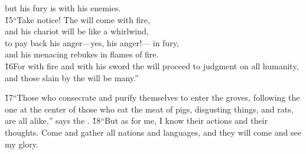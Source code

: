 \begin{poetry}
\poemlll       but his fury is with his enemies. \\
\poeml \v{15}``Take notice! The  will come with fire, \\
\poemll    and his chariot will be like a whirlwind, \\
\poeml to pay back his anger---yes, his anger!--- in fury, \\
\poemll    and his menacing rebukes in flames of fire. \\
\poeml \v{16}For with fire and with his sword the  will proceed to judgment on all humanity, \\
\poemll    and those slain by the  will be many.''
\end{poetry}

\v{17}``Those who consecrate and purify themselves to enter the groves, following the one at the center of those who eat the meat of pigs, disgusting things, and rats, are all alike,'' says the . \v{18}``But as for me, I know their actions and their thoughts. Come and gather all nations and languages, and they will come and see my glory.

